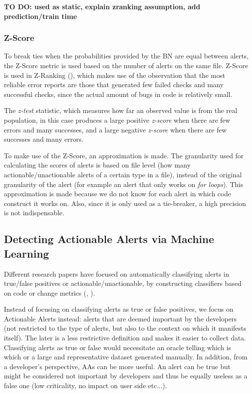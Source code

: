 \textbf{TO DO: used as static, explain zranking assumption, add prediction/train time}


\subsubsection{Z-Score}
To break ties when the probabilities provided by the BN are equal between alerts, the Z-Score metric is used based on the number of alerts on the same file. Z-Score is used in Z-Ranking (\cite{z-ranking}), which makes use of the observation that the most reliable error reports are those that generated few failed checks and many successful checks, since the actual amount of bugs in code is relatively small. 

The \textit{z-test} statistic, which measures how far an observed value is from the real population, in this case produces a large positive \textit{z-score} when there are few errors and many successes, and a large negative \textit{z-score} when there are few successes and many errors.

To make use of the Z-Score, an approximation is made. The granularity used for calculating the scores of alerts is based on file level (how many actionable/unactionable alerts of a certain type in a file), instead of the original granularity of the alert (for example an alert that only works on \textit{for loops}). This approximation is made because we do not know for each alert in which code construct it works on. Also, since it is only used as a tie-breaker, a high precision is not indispensable.

\subsection{Detecting Actionable Alerts via Machine Learning}

Different research papers have focused on automatically classifying alerts in true/false positives or actionable/unactionable, by constructing classifiers based on code or change metrics (\cite{actionable_sa}, \cite{model_building_actionable}).

Instead of focusing on classifying alerts as true or false positives, we focus on Actionable Alerts instead: alerts that are deemed important by the developers (not restricted to the type of alerts, but also to the context on which it manifests itself). The later is a less restrictive definition and makes it easier to collect data. Classifying alerts as true or false would necessitate an oracle telling which is which or a large and representative dataset generated manually. In addition, from a developer's perspective, AAs can be more useful. An alert can be true but might be considered not important by developers and thus be equally useless as a false one (low criticality, no impact on user side etc...).

